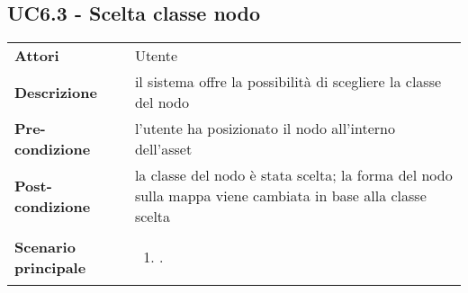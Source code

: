 \subsection{UC6.3 - Scelta classe nodo} 
\label{sssec:UC6.3} 
\def\arraystretch{1.5}
\begin{tabularx}{\textwidth}{l|p{}}
	\rowcolor{I} \multicolumn{2}{c}{\color{white}\textbf{UC6.3 - Scelta classe nodo}} \\
	\toprule
	\endhead
	\textbf{Attori} & Utente\\
	\textbf{Descrizione} & il sistema offre la possibilità di scegliere la classe del nodo\\
	\textbf{Pre-condizione} & l'utente ha posizionato il nodo all'interno dell'asset\\
	\textbf{Post-condizione} & la classe del nodo è stata scelta; la forma del nodo sulla mappa viene cambiata in base alla classe scelta\\
	\textbf{Scenario principale} & \vspace{-1.2em}\begin{enumerate}[leftmargin=*,noitemsep,nosep]
		\item \nameref{sssec:UC6.3}.
	\end{enumerate}\\
	\bottomrule
\end{tabularx}
